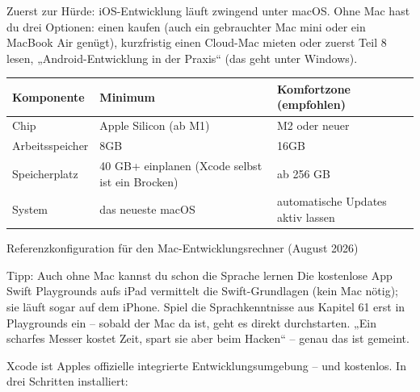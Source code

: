 


Zuerst zur Hürde: iOS-Entwicklung läuft zwingend unter macOS. Ohne Mac hast du drei Optionen: einen kaufen (auch ein gebrauchter Mac mini oder ein MacBook Air genügt), kurzfristig einen Cloud-Mac mieten oder zuerst Teil 8 lesen, „Android-Entwicklung in der Praxis“ (das geht unter Windows).

\begin{center}
\begin{tabularx}{\linewidth}{|X|X|X|}
\hline
\textbf{Komponente} & \textbf{Minimum} & \textbf{Komfortzone (empfohlen)} \tabularnewline
\hline
Chip & Apple Silicon (ab M1) & M2 oder neuer \tabularnewline
Arbeitsspeicher & 8GB & 16GB \tabularnewline
Speicherplatz & 40 GB+ einplanen (Xcode selbst ist ein Brocken) & ab 256 GB \tabularnewline
System & das neueste macOS & automatische Updates aktiv lassen \tabularnewline
\hline
\end{tabularx}
\end{center}

\begin{center}\small\color{gray}Referenzkonfiguration für den Mac-Entwicklungsrechner (August 2026)\end{center}

\begin{tcbinfo}{Tipp: Auch ohne Mac kannst du schon die Sprache lernen}
Die kostenlose App Swift Playgrounds aufs iPad vermittelt die Swift-Grundlagen (kein Mac nötig); sie läuft sogar auf dem iPhone. Spiel die Sprachkenntnisse aus Kapitel 61 erst in Playgrounds ein – sobald der Mac da ist, geht es direkt durchstarten. „Ein scharfes Messer kostet Zeit, spart sie aber beim Hacken“ – genau das ist gemeint.

\end{tcbinfo}


Xcode ist Apples offizielle integrierte Entwicklungsumgebung – und kostenlos. In drei Schritten installiert:

